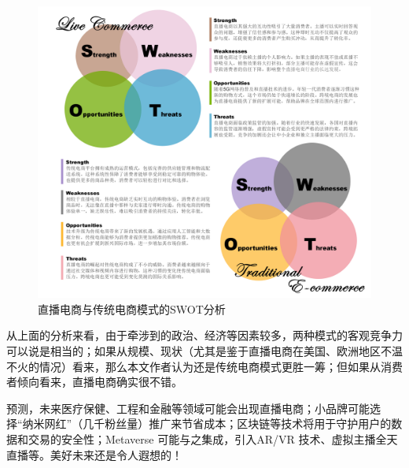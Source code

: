 \documentclass[12pt]{ctexart}
\begin{document}
\begin{figure}[htbp!]
    \centering
    \includegraphics[width=1\textwidth]{Images/22.png}
    \caption{直播电商与传统电商模式的SWOT分析}
    \label{swot}
\end{figure}

从上面的分析来看，由于牵涉到的政治、经济等因素较多，两种模式的客观竞争力可以说是相当的；如果从规模、现状（尤其是鉴于直播电商在美国、欧洲地区不温不火的情况）看来，那么本文作者认为还是传统电商模式更胜一筹；但如果从消费者倾向看来，直播电商确实很不错。

\cite{7}预测，未来医疗保健、工程和金融等领域可能会出现直播电商；小品牌可能选择“纳米网红”（几千粉丝量）推广来节省成本；区块链等技术将用于守护用户的数据和交易的安全性；Metaverse 可能与之集成，引入AR/VR 技术、虚拟主播全天直播等。美好未来还是令人遐想的！
\end{document}
